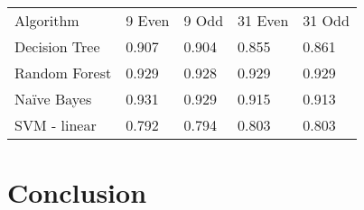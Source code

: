 \documentclass[aps, reprint, amsmath, amssymb]{revtex4-1}
\begin{document}
\begin{center}
  \begin{tabular}{ | l || l | l | l | l |}
    \hline
    Algorithm & 9 Even & 9 Odd & 31 Even & 31 Odd \\ \hhline{|=||=|=|=|=|}

    Decision Tree & 0.907 & 0.904 & 0.855 & 0.861 \\ \hline

    Random Forest & 0.929 & 0.928  & 0.929  & 0.929 \\ \hline

    Na{\"i}ve Bayes & 0.931  & 0.929 & 0.915 & 0.913 \\ \hline

    SVM - linear & 0.792 & 0.794 & 0.803 & 0.803 \\ \hline
    \hline
  \end{tabular}
\end{center}



\section{Conclusion}
\end{document}
